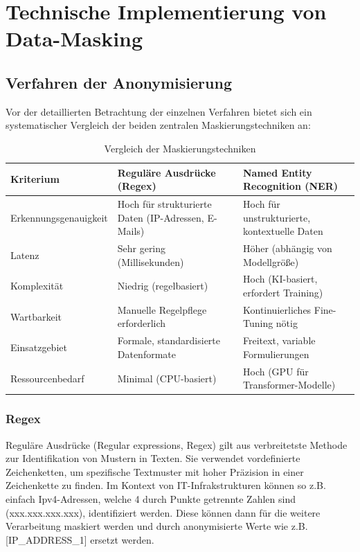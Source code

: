 \chapter{Technische Implementierung von Data-Masking}

\section{Verfahren der Anonymisierung}

Vor der detaillierten Betrachtung der einzelnen Verfahren bietet sich ein systematischer Vergleich der beiden zentralen Maskierungstechniken an:

\begin{table}[ht]
    \centering
    \caption{Vergleich der Maskierungstechniken}
    \label{tab:maskierungstechniken}
    \begin{tabular}{@{}p{3.5cm}p{5.5cm}p{5.5cm}@{}}
        \toprule
        \textbf{Kriterium}    & \textbf{Reguläre Ausdrücke (Regex)}                 & \textbf{Named Entity Recognition (NER)}      \\
        \midrule
        Erkennungsgenauigkeit & Hoch für strukturierte Daten (IP-Adressen, E-Mails) & Hoch für unstrukturierte, kontextuelle Daten \\
        Latenz                & Sehr gering (Millisekunden)                         & Höher (abhängig von Modellgröße)             \\
        Komplexität           & Niedrig (regelbasiert)                              & Hoch (KI-basiert, erfordert Training)        \\
        Wartbarkeit           & Manuelle Regelpflege erforderlich                   & Kontinuierliches Fine-Tuning nötig           \\
        Einsatzgebiet         & Formale, standardisierte Datenformate               & Freitext, variable Formulierungen            \\
        Ressourcenbedarf      & Minimal (CPU-basiert)                               & Hoch (GPU für Transformer-Modelle)           \\
        \bottomrule
    \end{tabular}
\end{table}

\subsection{Regex}
Reguläre Ausdrücke (Regular expressions, Regex) gilt aus verbreitetste Methode zur Identifikation von Mustern in Texten.
Sie verwendet vordefinierte Zeichenketten, um spezifische Textmuster mit hoher Präzision in einer Zeichenkette zu finden.
Im Kontext von IT-Infrakstrukturen können so z.B. einfach Ipv4-Adressen, welche 4 durch Punkte getrennte Zahlen sind (xxx.xxx.xxx.xxx), identifiziert werden.
Diese können dann für die weitere Verarbeitung maskiert werden und durch anonymisierte Werte wie z.B. [IP\_ADDRESS\_1] ersetzt werden.

